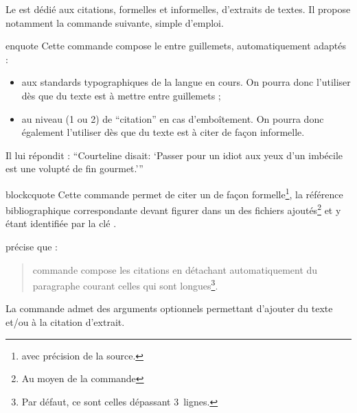 \documentclass[french,nolocaltoc]{nwejmart}
\newtheorem[style=definition]{fait}
\newtheorem[title=contraventionnalisation]{ctrv}
\newtheorem[title-plural=anneaux]{anneau}
\newtheorem[title-plural=idéaux]{idéal}
\begin{document}
Le  est dédié aux citations, formelles et informelles,
d'extraits de textes. Il propose notamment la commande 
suivante, simple d'emploi.

\begin{docCommand}{enquote}{}
  Cette commande compose le  entre guillemets, automatiquement
  adaptés :
  \begin{itemize}
  \item aux standards typographiques de la langue en cours. On pourra donc
    l'utiliser dès que du texte est à mettre entre guillemets ;
  \item au niveau (1 ou 2) de \enquote{citation} en cas d'emboîtement. On
    pourra donc également l'utiliser dès que du texte est à citer de façon
    informelle.
  \end{itemize}
\begin{bodycode}[listing and text,listing options={alsolanguage={[csquotes]TeX}}]
Il lui répondit : \enquote{Courteline disait: \enquote{Passer
    pour un idiot aux yeux d'un imbécile est une volupté de fin
    gourmet.}}
\end{bodycode}
\end{docCommand}

\begin{docCommand}{blockcquote}{}
  Cette commande permet de citer un  de façon
  formelle\footnote{\Ie*{} avec précision de la source.}, la référence
  bibliographique correspondante devant figurer dans un des fichiers 
  ajoutés\footnote{Au moyen de la commande } et
  y étant identifiée par la clé .

\renewcommand{\thempfootnote}{\arabic{mpfootnote}}
\begin{bodycode}[listing and text,listing options={alsolanguage={[biblatex]TeX},alsolanguage={[csquotes]TeX},deletekeywords={[3]footnote}}]
\citeauthor{Bitouze} précise que :
\blockcquote{Bitouze}{%
   commande compose les citations en détachant
  automatiquement du paragraphe courant celles qui sont
  longues\footnote{Par défaut, ce sont celles
    dépassant 3~lignes.}.%
}.
\end{bodycode}
\renewcommand{\thempfootnote}{\alph{mpfootnote}}
\end{docCommand}

La commande  admet des arguments optionnels permettant
d'ajouter du texte  et/ou  à la citation
d'extrait\autocite[Pour plus de détails, cf. par exemple][]{Bitouze}.
\end{document}

